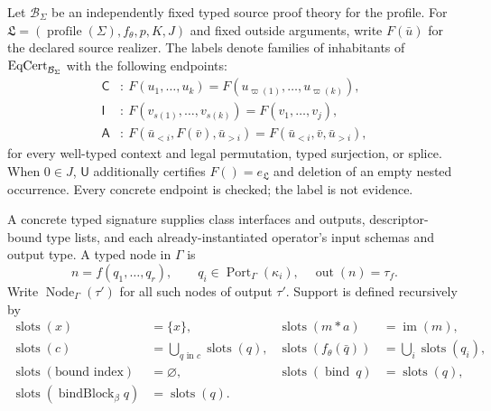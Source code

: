 Let $\mathcal B_\Sigma$ be an independently fixed typed source proof theory
for the profile.  For
$\mathfrak L=(\operatorname{profile}(\Sigma),f_\theta,p,K,J)$ and fixed
outside arguments, write $F(\bar u)$ for the declared source realizer.
The labels denote families of inhabitants of $\operatorname{EqCert}_{\mathcal B_\Sigma}$
with the following endpoints:
\begin{align*}
\mathsf C&:\ F(u_1,\ldots,u_k)=F(u_{\varpi(1)},\ldots,u_{\varpi(k)}),\\
\mathsf I&:\ F(v_{s(1)},\ldots,v_{s(k)})=F(v_1,\ldots,v_j),\\
\mathsf A&:\ F(\bar u_{<i},F(\bar v),\bar u_{>i})
=F(\bar u_{<i},\bar v,\bar u_{>i}),
\end{align*}
for every well-typed context and legal permutation, typed surjection, or
splice.  When $0\in J$, $\mathsf U$ additionally certifies
$F()=e_{\mathfrak L}$ and deletion of an empty nested occurrence.  Every
concrete endpoint is checked; the label is not evidence.

\begin{definition}
\label{res:F06}
A concrete typed signature supplies class interfaces and outputs,
descriptor-bound type lists, and each already-instantiated operator's input
schemas and output type.  A typed node in $\Gamma$ is
\[
n=f(q_1,\ldots,q_r),\qquad
q_i\in\operatorname{Port}_\Gamma(\kappa_i),
\quad\operatorname{out}(n)=\tau_f.
\]
Write $\operatorname{Node}_\Gamma(\tau')$ for all such nodes of output
$\tau'$.  Support is defined recursively by
\begin{align*}
\operatorname{slots}(x)&=\{x\},&
\operatorname{slots}(m*a)&=\operatorname{im}(m),\\
\operatorname{slots}(c)&=\bigcup_{q\text{ in }c}\operatorname{slots}(q),&
\operatorname{slots}(f_\theta(\bar q))&=\bigcup_i\operatorname{slots}(q_i),\\
\operatorname{slots}(\text{bound index})&=\varnothing,&
\operatorname{slots}(\operatorname{bind}\ q)&=\operatorname{slots}(q),\\
\operatorname{slots}(\operatorname{bindBlock}_\beta q)&=\operatorname{slots}(q).&&
\end{align*}
\end{definition}

